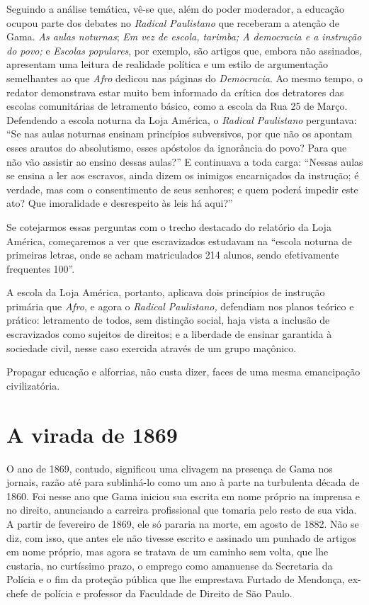 Seguindo a análise temática, vê-se que, além do poder moderador, a
educação ocupou parte dos debates no \emph{Radical Paulistano} que
receberam a atenção de Gama. \emph{As aulas noturnas}; \emph{Em vez de
escola, tarimba; A democracia e a instrução do povo;} e \emph{Escolas
populares}, por exemplo, são artigos que, embora não assinados,
apresentam uma leitura de realidade política e um estilo de argumentação
semelhantes ao que \emph{Afro} dedicou nas páginas do \emph{Democracia}.
Ao mesmo tempo, o redator demonstrava estar muito bem informado da
crítica dos detratores das escolas comunitárias de letramento básico,
como a escola da Rua 25 de Março. Defendendo a escola noturna da Loja
América, o \emph{Radical Paulistano} perguntava: ``Se nas aulas noturnas
ensinam princípios subversivos, por que não os apontam esses arautos do
absolutismo, esses apóstolos da ignorância do povo? Para que não vão
assistir ao ensino dessas aulas?'' E continuava a toda carga: ``Nessas
aulas se ensina a ler aos escravos, ainda dizem os inimigos encarniçados
da instrução; é verdade, mas com o consentimento de seus senhores; e
quem poderá impedir este ato? Que imoralidade e desrespeito às leis há
aqui?''

Se cotejarmos essas perguntas com o trecho destacado do relatório da
Loja América, começaremos a ver que escravizados estudavam na ``escola
noturna de primeiras letras, onde se acham matriculados 214 alunos,
sendo efetivamente frequentes 100''.

A escola da Loja América, portanto, aplicava dois princípios de
instrução primária que \emph{Afro}, e agora o \emph{Radical Paulistano,}
defendiam nos planos teórico e prático: letramento de todos, sem
distinção social, haja vista a inclusão de escravizados como sujeitos de
direitos; e a liberdade de ensinar garantida à sociedade civil, nesse
caso exercida através de um grupo maçônico.

Propagar educação e alforrias, não custa dizer, faces de uma mesma
emancipação civilizatória.

\section{A virada de 1869}

O ano de 1869, contudo, significou uma clivagem na presença de Gama nos
jornais, razão até para sublinhá-lo como um ano à parte na turbulenta
década de 1860. Foi nesse ano que Gama iniciou sua escrita em nome
próprio na imprensa e no direito, anunciando a carreira profissional que
tomaria pelo resto de sua vida. A partir de fevereiro de 1869, ele só
pararia na morte, em agosto de 1882. Não se diz, com isso, que antes ele
não tivesse escrito e assinado um punhado de artigos em nome próprio,
mas agora se tratava de um caminho sem volta, que lhe custaria, no
curtíssimo prazo, o emprego como amanuense da Secretaria da Polícia e o
fim da proteção pública que lhe emprestava Furtado de Mendonça, ex-chefe
de polícia e professor da Faculdade de Direito de São Paulo.


